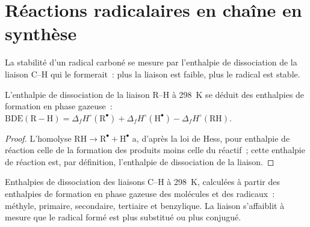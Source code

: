 \section{Réactions radicalaires en chaîne en synthèse}

La stabilité d'un radical carboné se mesure par l'enthalpie de dissociation
de la liaison C--H qui le formerait~: plus la liaison est faible, plus le
radical est stable.

\begin{proposition}\label{prop:b3:radicals-carbenes:bde}
L'enthalpie de dissociation de la liaison R--H à \qty{298}{K} se déduit des enthalpies de formation en phase gazeuse~:
$\mathrm{BDE(R{-}H)} = \Delta_fH^\circ(\mathrm R^\bullet) + \Delta_fH^\circ(\mathrm H^\bullet) - \Delta_fH^\circ(\mathrm{RH})$.
\end{proposition}

\begin{proof}
L'homolyse $\mathrm{RH \to R^\bullet + H^\bullet}$ a, d'après la loi de Hess, pour enthalpie de réaction celle de la formation des produits
moins celle du réactif~; cette enthalpie de réaction est, par définition,
l'enthalpie de dissociation de la liaison.
\end{proof}

\begin{omfigure}

{\small Enthalpies de dissociation des liaisons C--H à \qty{298}{K},
calculées à partir des enthalpies de formation en phase gazeuse des
molécules et des radicaux~: méthyle, primaire, secondaire, tertiaire et
benzylique. La liaison s'affaiblit à mesure que le radical formé est plus
substitué ou plus conjugué.}
\end{omfigure}


